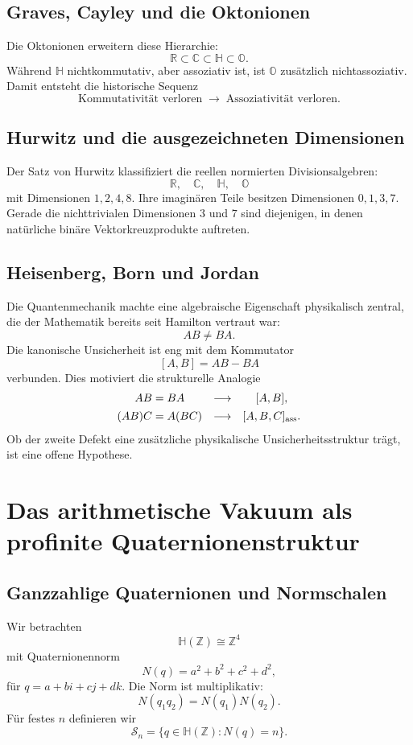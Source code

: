 \documentclass[11pt,a4paper]{article}
\newcommand{\OO}{\mathbb O}
\newcommand{\HH}{\mathbb H}
\newcommand{\RR}{\mathbb R}
\newcommand{\ZZ}{\mathbb Z}
\begin{document}
\subsection{Graves, Cayley und die Oktonionen}
Die Oktonionen erweitern diese Hierarchie:
\[
\RR\subset\mathbb C\subset\HH\subset\OO.
\]
Während $\HH$ nichtkommutativ, aber assoziativ ist, ist $\OO$ zusätzlich nichtassoziativ. Damit entsteht die historische Sequenz
\[
\boxed{\text{Kommutativität verloren}\;\longrightarrow\;\text{Assoziativität verloren}.}
\]

\subsection{Hurwitz und die ausgezeichneten Dimensionen}
Der Satz von Hurwitz klassifiziert die reellen normierten Divisionsalgebren:
\[
\RR,\quad\mathbb C,\quad\HH,\quad\OO
\]
mit Dimensionen $1,2,4,8$. Ihre imaginären Teile besitzen Dimensionen $0,1,3,7$. Gerade die nichttrivialen Dimensionen $3$ und $7$ sind diejenigen, in denen natürliche binäre Vektorkreuzprodukte auftreten.

\subsection{Heisenberg, Born und Jordan}
Die Quantenmechanik machte eine algebraische Eigenschaft physikalisch zentral, die der Mathematik bereits seit Hamilton vertraut war:
\[
AB\neq BA.
\]
Die kanonische Unsicherheit ist eng mit dem Kommutator
\[
[A,B]=AB-BA
\]
verbunden. Dies motiviert die strukturelle Analogie
\[
\begin{array}{ccc}
AB=BA &\longrightarrow& [A,B],\\[0.4em]
(AB)C=A(BC) &\longrightarrow& [A,B,C]_{\rm ass}.
\end{array}
\]
Ob der zweite Defekt eine zusätzliche physikalische Unsicherheitsstruktur trägt, ist eine offene Hypothese.

\section{Das arithmetische Vakuum als profinite Quaternionenstruktur}
\subsection{Ganzzahlige Quaternionen und Normschalen}
Wir betrachten
\[
\HH(\ZZ)\cong\ZZ^4
\]
mit Quaternionennorm
\[
N(q)=a^2+b^2+c^2+d^2,
\]
für $q=a+bi+cj+dk$. Die Norm ist multiplikativ:
\[
\boxed{N(q_1q_2)=N(q_1)N(q_2).}
\]
Für festes $n$ definieren wir
\[
\mathcal S_n=\{q\in\HH(\ZZ):N(q)=n\}.
\]
\end{document}
